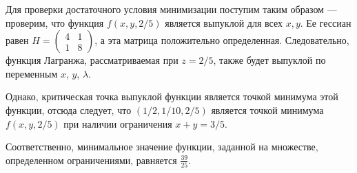 \begin{problem}
\begin{sol}

Для проверки достаточного условия минимизации поступим таким образом --- проверим, что функция $f(x,y,2/5)$ является выпуклой для всех $x,y$. Ее гессиан равен $H=\left(\begin{array}{cc} {4} & {1} \\ {1} & {8} \end{array}\right)$, а эта матрица положительно определенная. Следовательно, функция Лагранжа, рассматриваемая при $z=2/5$, также будет выпуклой по переменным $x$, $y$, $\lambda$.


Однако, критическая точка выпуклой функции является точкой минимума этой функции, отсюда следует, что $(1/2, 1/10, 2/5)$ является точкой минимума $f(x,y,2/5)$ при наличии ограничения $x+y=3/5$.

Соответственно, минимальное значение функции, заданной на множестве, определенном ограничениями, равняется  $\frac{39}{25} $.
\end{sol}
\end{problem}


